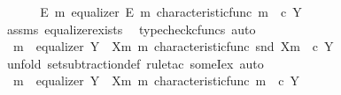 \begin{isabellebody}
%
\isadelimproof
%
\endisadelimproof
%
\isatagproof
{}\isamarkupfalse%
\ {\isacharminus}{\kern0pt}\isanewline
\ \ \isamarkupfalse%
\ {\isachardoublequoteopen}{\isasymexists}\ E\ m{\isacharprime}{\kern0pt}{\isachardot}{\kern0pt}\ equalizer\ E\ m{\isacharprime}{\kern0pt}\ {\isacharparenleft}{\kern0pt}characteristic{\isacharunderscore}{\kern0pt}func\ m{\isacharparenright}{\kern0pt}\ {\isacharparenleft}{\kern0pt}{\isasymf}\ {\isasymcirc}\isactrlsub c\ {\isasymbeta}\isactrlbsub Y\isactrlesub {\isacharparenright}{\kern0pt}{\isachardoublequoteclose}\isanewline
\ \ \ \ \isamarkupfalse%
\ assms\ equalizer{\isacharunderscore}{\kern0pt}exists\ \isamarkupfalse%
\ {\isacharparenleft}{\kern0pt}typecheck{\isacharunderscore}{\kern0pt}cfuncs{\isacharcomma}{\kern0pt}\ auto{\isacharparenright}{\kern0pt}\isanewline
\ \ \isamarkupfalse%
\ \isamarkupfalse%
\ {\isachardoublequoteopen}{\isasymexists}\ m{\isacharprime}{\kern0pt}{\isachardot}{\kern0pt}\ \ equalizer\ {\isacharparenleft}{\kern0pt}Y\ {\isasymsetminus}\ {\isacharparenleft}{\kern0pt}X{\isacharcomma}{\kern0pt}m{\isacharparenright}{\kern0pt}{\isacharparenright}{\kern0pt}\ m{\isacharprime}{\kern0pt}\ {\isacharparenleft}{\kern0pt}characteristic{\isacharunderscore}{\kern0pt}func\ {\isacharparenleft}{\kern0pt}snd\ {\isacharparenleft}{\kern0pt}X{\isacharcomma}{\kern0pt}m{\isacharparenright}{\kern0pt}{\isacharparenright}{\kern0pt}{\isacharparenright}{\kern0pt}\ {\isacharparenleft}{\kern0pt}{\isasymf}\ {\isasymcirc}\isactrlsub c\ {\isasymbeta}\isactrlbsub Y\isactrlesub {\isacharparenright}{\kern0pt}{\isachardoublequoteclose}\isanewline
\ \ \ \ \isamarkupfalse%
\ {\isacharparenleft}{\kern0pt}unfold\ set{\isacharunderscore}{\kern0pt}subtraction{\isacharunderscore}{\kern0pt}def{\isacharcomma}{\kern0pt}\ rule{\isacharunderscore}{\kern0pt}tac\ someI{\isacharunderscore}{\kern0pt}ex{\isacharcomma}{\kern0pt}\ auto{\isacharparenright}{\kern0pt}\isanewline
\ \ \isamarkupfalse%
\ \isamarkupfalse%
\ {\isachardoublequoteopen}{\isasymexists}\ m{\isacharprime}{\kern0pt}{\isachardot}{\kern0pt}\ \ equalizer\ {\isacharparenleft}{\kern0pt}Y\ {\isasymsetminus}\ {\isacharparenleft}{\kern0pt}X{\isacharcomma}{\kern0pt}m{\isacharparenright}{\kern0pt}{\isacharparenright}{\kern0pt}\ m{\isacharprime}{\kern0pt}\ {\isacharparenleft}{\kern0pt}characteristic{\isacharunderscore}{\kern0pt}func\ m{\isacharparenright}{\kern0pt}\ {\isacharparenleft}{\kern0pt}{\isasymf}\ {\isasymcirc}\isactrlsub c\ {\isasymbeta}\isactrlbsub Y\isactrlesub {\isacharparenright}{\kern0pt}{\isachardoublequoteclose}\isanewline

\end{isabellebody}
